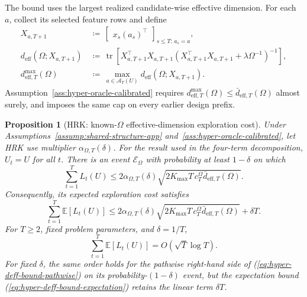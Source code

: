 \documentclass{article} %
\newtheorem{proposition}[theorem]{Proposition}
\renewcommand{\eqref}[1]{\textup{(\ref{#1})}}
\begin{document}
The bound uses the largest realized candidate-wise effective dimension. For
each \(a\), collect its selected feature rows and define
\begin{align}
X_{a,T+1}
&\,\coloneqq\,
\begin{bmatrix}
x_s(a_s)^\top
\end{bmatrix}_{s\le T:\,a_s=a},
\label{eq:hyper-oracle-XaT}
\\
d_{\mathrm{eff}}(\Omega;X_{a,T+1})
&\,\coloneqq\,
\operatorname{tr}
\!\left[
X_{a,T+1}^{\top}X_{a,T+1}
\left(
X_{a,T+1}^{\top}X_{a,T+1}+\lambda\Omega^{-1}
\right)^{-1}
\right],
\label{eq:hyper-oracle-deff-a}
\\
d_{\mathrm{eff},T}^{\max}(\Omega)
&\,\coloneqq\,
\max_{a\in\mathcal A_T(U)}
d_{\mathrm{eff}}(\Omega;X_{a,T+1}).
\label{eq:hyper-oracle-deff-max}
\end{align}
Assumption~\ref{ass:hyper-oracle-calibrated} requires
$d_{\mathrm{eff},T}^{\max}(\Omega)\le
\bar d_{\mathrm{eff},T}(\Omega)$ almost surely, and imposes the same cap on
every earlier design prefix.

\begin{proposition}[HRK: known-\(\Omega\) effective-dimension exploration cost]
\label{prop:deff-bound-app}
Under Assumptions~\ref{assump:shared-structure-app}
and~\ref{ass:hyper-oracle-calibrated}, let HRK use
multiplier $\alpha_{\Omega,T}(\delta)$. For the result used in the four-term
decomposition, \(U_t=U\) for all \(t\). There is an event
$\mathcal E_\Omega$ with probability at least $1-\delta$ on which
\begin{equation}
\label{eq:hyper-deff-bound-pathwise}
\sum_{t=1}^{T}L_t(U)
\le
2\alpha_{\Omega,T}(\delta)
\sqrt{
2K_{\max}T\,c_T^\Omega
\bar d_{\mathrm{eff},T}(\Omega)
}.
\end{equation}
Consequently, its expected exploration cost satisfies
\begin{equation}
\label{eq:hyper-deff-bound-expectation}
\sum_{t=1}^{T}\mathbb{E}[L_t(U)]
\le
2\alpha_{\Omega,T}(\delta)
\sqrt{
2K_{\max}T\,c_T^\Omega
\bar d_{\mathrm{eff},T}(\Omega)
}
+
\delta T .
\end{equation}
For \(T\ge2\), fixed problem parameters, and $\delta=1/T$,
\begin{equation}
\label{eq:hyper-deff-bound-rate}
\sum_{t=1}^{T}\mathbb{E}[L_t(U)]
=
O\!\left(\sqrt{T}\log T\right).
\end{equation}
For fixed $\delta$, the same order holds for the pathwise right-hand side of
\eqref{eq:hyper-deff-bound-pathwise} on its probability-\((1-\delta)\) event,
but the expectation bound \eqref{eq:hyper-deff-bound-expectation} retains the
linear term $\delta T$.
\end{proposition}
\end{document}
